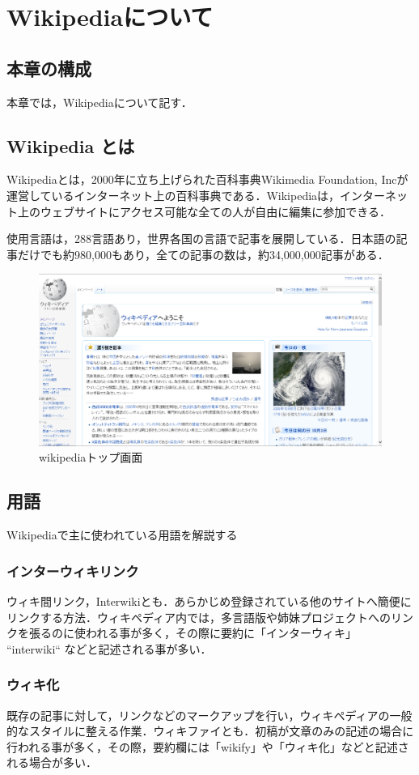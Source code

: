 \chapter{Wikipediaについて}
\section{本章の構成}
本章では，Wikipediaについて記す．
\section{Wikipedia とは}
Wikipediaとは，2000年に立ち上げられた百科事典Wikimedia Foundation, Incが運営しているインターネット上の百科事典である．Wikipediaは，インターネット上のウェブサイトにアクセス可能な全ての人が自由に編集に参加できる．

使用言語は，288言語あり，世界各国の言語で記事を展開している．日本語の記事だけでも約980,000もあり，全ての記事の数は，約34,000,000記事がある．\cite{wikipedia}

\begin{figure}[htb]
\centering
\includegraphics[width=12cm]{wikipedia.png}
\caption{wikipediaトップ画面}\label{図}
\end{figure}

\section{用語}
Wikipediaで主に使われている用語を解説する\cite{yougo}
\subsection{インターウィキリンク}
ウィキ間リンク，Interwikiとも．あらかじめ登録されている他のサイトへ簡便にリンクする方法．ウィキペディア内では，多言語版や姉妹プロジェクトへのリンクを張るのに使われる事が多く，その際に要約に「インターウィキ」 “interwiki“ などと記述される事が多い．
\subsection{ウィキ化}
既存の記事に対して，リンクなどのマークアップを行い，ウィキペディアの一般的なスタイルに整える作業．ウィキファイとも．初稿が文章のみの記述の場合に行われる事が多く，その際，要約欄には「wikify」や「ウィキ化」などと記述される場合が多い．

